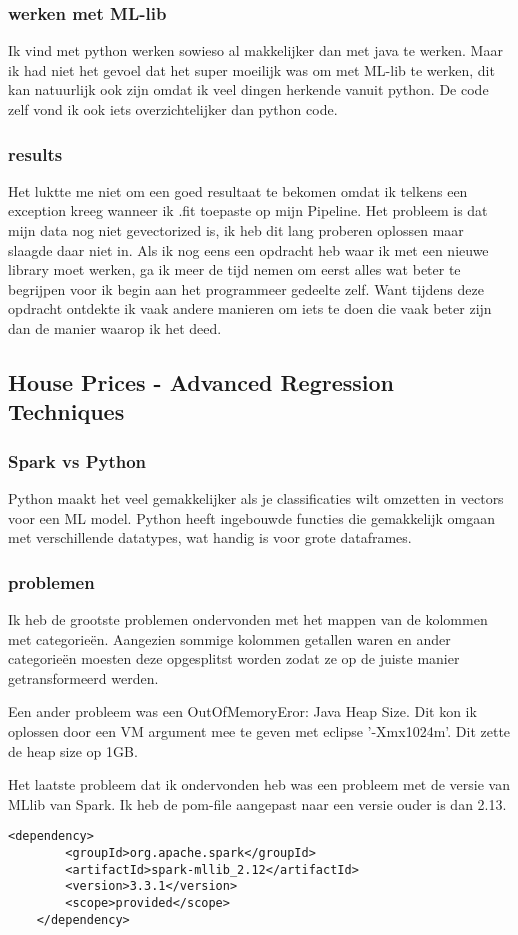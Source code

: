 \subsubsection{werken met ML-lib}
Ik vind met python werken sowieso al makkelijker dan met java te werken. Maar ik had niet het gevoel dat het super moeilijk was om met ML-lib te werken, dit kan natuurlijk ook zijn omdat ik veel dingen herkende vanuit python. De code zelf vond ik ook iets overzichtelijker dan python code.

\subsubsection{results}
Het luktte me niet om een goed resultaat te bekomen omdat ik telkens een exception kreeg wanneer ik .fit toepaste op mijn Pipeline. Het probleem is dat mijn data nog niet gevectorized is, ik heb dit lang proberen oplossen maar slaagde daar niet in. Als ik nog eens een opdracht heb waar ik met een nieuwe library moet werken, ga ik meer de tijd nemen om eerst alles wat beter te begrijpen voor ik begin aan het programmeer gedeelte zelf. Want tijdens deze opdracht ontdekte ik vaak andere manieren om iets te doen die vaak beter zijn dan de manier waarop ik het deed.

\subsection{House Prices - Advanced Regression Techniques}
\subsubsection{Spark vs Python}
Python maakt het veel gemakkelijker als je classificaties wilt omzetten in vectors voor een ML model. Python heeft ingebouwde functies die gemakkelijk omgaan met verschillende datatypes, wat handig is voor grote dataframes.

\subsubsection{problemen}
Ik heb de grootste problemen ondervonden met het mappen van de kolommen met categorieën. Aangezien sommige kolommen getallen waren en ander categorieën moesten deze opgesplitst worden zodat ze op de juiste manier getransformeerd werden.

Een ander probleem was een OutOfMemoryEror: Java Heap Size. Dit kon ik oplossen door een VM argument mee te geven met eclipse '-Xmx1024m'. Dit zette de heap size op 1GB.

Het laatste probleem dat ik ondervonden heb was een probleem met de versie van MLlib van Spark. Ik heb de pom-file aangepast naar een versie ouder is dan 2.13.

\begin{lstlisting}[style=codeStyle]
    <dependency>
        <groupId>org.apache.spark</groupId>
        <artifactId>spark-mllib_2.12</artifactId>
        <version>3.3.1</version>
        <scope>provided</scope>
    </dependency>
    
\end{lstlisting}
  

